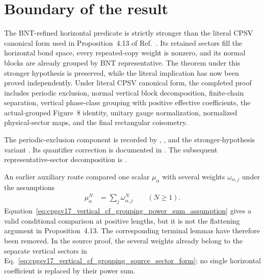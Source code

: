 \documentclass{article}
\begin{document}
\section{Boundary of the result}

The BNT-refined horizontal predicate
 is strictly stronger than the literal CPSV
canonical form used in Proposition~4.13 of
Ref.~\cite{Cirac2016MPDO_arXiv}. Its retained sectors fill the horizontal bond
space, every repeated-copy weight is nonzero, and its normal blocks are already
grouped by BNT representative. The theorem under this stronger hypothesis is
preserved, while the literal implication has now been proved independently.
Under literal CPSV canonical form, the completed proof includes periodic
exclusion, normal vertical block decomposition, finite-chain separation,
vertical phase-class grouping with positive effective coefficients, the
actual-grouped Figure~8 identity, unitary gauge normalization, normalized
physical-sector maps, and the final rectangular coisometry.

The periodic-exclusion component is recorded by
,
, and
the stronger-hypothesis variant
. Its
quantifier correction is documented in
. The subsequent
representative-sector decomposition is
.

An earlier auxiliary route compared one scalar $\mu_\alpha$ with several
weights $\omega_{\alpha,j}$ under the assumptions
\begin{align}
    \mu_\alpha^N
     & =\sum_j\omega_{\alpha,j}^N
    \qquad (N\geq1).
    \label{eq:cpgsv17_vertical_cf_grouping_power_sum_assumption}
\end{align}
Equation~\ref{eq:cpgsv17_vertical_cf_grouping_power_sum_assumption} gives a
valid conditional comparison at positive lengths, but it is not the flattening
argument in Proposition~4.13. The corresponding terminal lemmas have therefore
been removed. In the source proof, the several weights already belong to the
separate vertical sectors in
Eq.~\ref{eq:cpgsv17_vertical_cf_grouping_source_sector_form}; no single
horizontal coefficient is replaced by their power sum.
\end{document}
